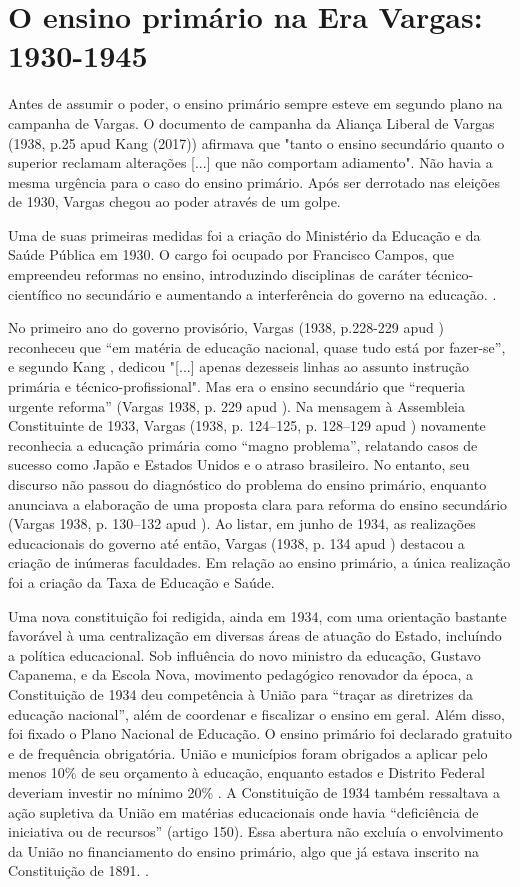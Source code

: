 \documentclass[a4paper,12pt]{article}
\begin{document}
\section*{O ensino primário na Era Vargas: 1930-1945}

Antes de assumir o poder, o ensino primário sempre esteve em segundo plano na campanha de Vargas.
O documento de campanha da Aliança Liberal de Vargas (1938, p.25 apud Kang (2017)) afirmava que "tanto o ensino secundário quanto o superior reclamam alterações [...] que não comportam adiamento".
Não havia a mesma urgência para o caso do ensino primário. Após ser derrotado nas eleições de 1930,
Vargas chegou ao poder através de um golpe.

Uma de suas primeiras medidas foi a criação do Ministério da Educação e da Saúde Pública em 1930.
O cargo foi ocupado por Francisco Campos,
que empreendeu reformas no ensino,
introduzindo disciplinas de caráter técnico-científico no secundário e aumentando a interferência do governo na educação. \cite{capanema}.

No primeiro ano do governo provisório,
Vargas (1938, p.228-229 apud \cite{kang}) reconheceu que “em matéria de educação nacional, quase tudo está por fazer-se”, e segundo Kang \cite*[p. 39]{kang}, dedicou "[...] apenas dezesseis linhas ao assunto instrução primária e técnico-profissional".
Mas era o ensino secundário que “requeria urgente reforma” (Vargas 1938, p. 229 apud \cite{kang}).
Na mensagem à Assembleia Constituinte de 1933,
Vargas (1938, p. 124–125, p. 128–129 apud \cite{kang}) novamente reconhecia a educação primária como “magno problema”,
relatando casos de sucesso como Japão e Estados Unidos e o atraso brasileiro.
No entanto, seu discurso não passou do diagnóstico do problema do ensino primário,
enquanto anunciava a elaboração de uma proposta clara para reforma do ensino secundário (Vargas 1938, p. 130–132 apud \cite{kang}).
Ao listar, em junho de 1934, as realizações educacionais do governo até então, Vargas (1938, p. 134 apud \cite{kang}) destacou a criação de inúmeras faculdades.
Em relação ao ensino primário, a única realização foi a criação da Taxa de Educação e Saúde.

Uma nova constituição foi redigida, ainda em 1934, com uma orientação bastante favorável à uma centralização em diversas áreas de atuação do Estado,
incluíndo a política educacional. Sob influência do novo ministro da educação,
Gustavo Capanema, e da Escola Nova, movimento pedagógico renovador da época,
a Constituição de 1934 deu competência à União para “traçar as diretrizes da educação nacional”,
além de coordenar e fiscalizar o ensino em geral. Além disso, foi fixado o Plano Nacional de Educação.
O ensino primário foi declarado gratuito e de frequência obrigatória.
União e municípios foram obrigados a aplicar pelo menos 10\% de seu orçamento à educação,
enquanto estados e Distrito Federal deveriam investir no mínimo 20\% \cite{silva}. A Constituição de 1934 também ressaltava a ação supletiva da União em matérias educacionais onde havia “deficiência de iniciativa ou de recursos” (artigo 150).
Essa abertura não excluía o envolvimento da União no financiamento do ensino primário, algo que já estava inscrito na Constituição de 1891. \cite{kang}.
\end{document}
